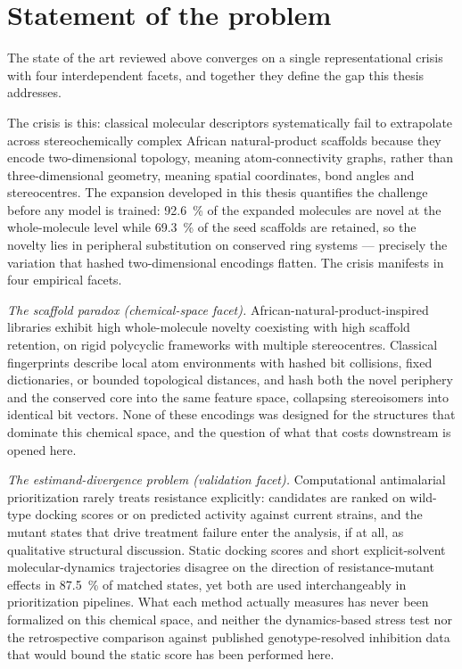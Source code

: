 \section*{Statement of the problem}

The state of the art reviewed above converges on a single representational crisis with four interdependent facets, and together they define the gap this thesis addresses.

The crisis is this: classical molecular descriptors systematically fail to extrapolate across stereochemically complex African natural-product scaffolds because they encode two-dimensional topology, meaning atom-connectivity graphs, rather than three-dimensional geometry, meaning spatial coordinates, bond angles and stereocentres. The expansion developed in this thesis quantifies the challenge before any model is trained: \qty{92.6}{\percent} of the expanded molecules are novel at the whole-molecule level while \qty{69.3}{\percent} of the seed scaffolds are retained, so the novelty lies in peripheral substitution on conserved ring systems --- precisely the variation that hashed two-dimensional encodings flatten. The crisis manifests in four empirical facets.

\emph{The scaffold paradox (chemical-space facet).} African-natural-product-inspired libraries exhibit high whole-molecule novelty coexisting with high scaffold retention, on rigid polycyclic frameworks with multiple stereocentres. Classical fingerprints describe local atom environments with hashed bit collisions, fixed dictionaries, or bounded topological distances, and hash both the novel periphery and the conserved core into the same feature space, collapsing stereoisomers into identical bit vectors. None of these encodings was designed for the structures that dominate this chemical space, and the question of what that costs downstream is opened here.

\emph{The estimand-divergence problem (validation facet).} Computational antimalarial prioritization rarely treats resistance explicitly: candidates are ranked on wild-type docking scores or on predicted activity against current strains, and the mutant states that drive treatment failure enter the analysis, if at all, as qualitative structural discussion. Static docking scores and short explicit-solvent molecular-dynamics trajectories disagree on the direction of resistance-mutant effects in \qty{87.5}{\percent} of matched states, yet both are used interchangeably in prioritization pipelines. What each method actually measures has never been formalized on this chemical space, and neither the dynamics-based stress test nor the retrospective comparison against published genotype-resolved inhibition data that would bound the static score has been performed here.

